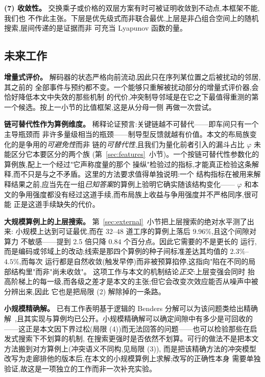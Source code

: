 \documentclass[manuscript,screen,review]{acmart}
\newcommand{\PubGapBig}{9.96\%}           %
\newcommand{\PubBudgetRatio}{2.5}
\newcommand{\PubBudgetGainPP}{0.84}       %
\newcommand{\PubCvBig}{$2.3\%$--$4.5\%$} %
\begin{document}
\textbf{(7) 收敛性。} 交换乘子或价格的双层方案有时可被证明收敛到不动点,本框架不能,我们也
不作此主张。下层是优先级式而非联合最优,上层是非凸组合空间上的随机搜索,层间传递的是证据而非
可充当 Lyapunov 函数的量。

\subsection{未来工作}
\label{sec:future_work}

\textbf{增量式评价。} 解码器的状态严格向前流动,因此只在序列某位置之后被扰动的邻居,其之前的
全部事件与预约都不变。一个能够只重解被扰动部分的增量式评价器,会恰好降低本文中失效的那些机制
的代价,冲突制导邻域是在它之下最值得重测的第一个候选。按上一小节的比值框架,这是从分母一侧
再做一次尝试。

\textbf{链可替代性作为算例维度。} 稀释论证预言:关键链越不可替代——即车间只有一个主导瓶颈而
非许多量级相当的瓶颈——制导型反馈就越有价值。本文的布局族变化的是争用的\emph{可避免性}而非
链的\emph{可替代性},且我们为量化前者引入的漏斗占比 $\varphi$ 未能区分它本要区分的两个族
(第~\ref{sec:features}~小节)。一个按链可替代性参数化的算例族,配上一个经过"它声称度量的那个
操纵"检验过的指标,才能真正检验这条解释,而不只是与之不矛盾。这里的方法要求值得单独说明:一个
结构指标在被用来解释结果之前,应当先在一组\emph{已知答案}的算例上验明它确实随该结构变化——
$\varphi$ 和本文的争用强度都没有经过这道手续,而布局族上收益与争用强度并不严格同序,很可能
正是这道手续缺失的代价。

\textbf{大规模算例上的上层搜索。} 第~\ref{sec:external}~小节把上层搜索的绝对水平测了出来:
小规模上达到可证最优,而在 $32$--$48$ 道工序的算例上落后 \PubGapBig{},且这个间隙对算力
不敏感——提到 \PubBudgetRatio{} 倍只降 $\PubBudgetGainPP$ 个百分点。因此它需要的不是更长的
运行,而是编码或邻域上的改动;线索是那四个算例的种子间标准差达其均值的 \PubCvBig{},而每次
运行都是自然收敛(触发早停)而非被预算掐停,这指向"陷在不同的局部结构里"而非"尚未收敛"。
这项工作与本文的机制结论\emph{正交}:上层变强会同时
抬高阶梯上的每一级,而各级之差才是本文的主张;但它会改变次效应能否从噪声中被分辨出来,因此
它也是把局限 (2) 解除掉的一条路。

\textbf{小规模精确解。} 已有工作表明基于逻辑的 Benders 分解可以为该问题类给出精确
解~\cite{vanos2026exact},且其实现与算例均已公开。小规模精确解可以确定间隙中有多少是可回收的
——这正是本文因下界过松(局限 (4))而无法回答的问题——也可以检验那些在启发式搜索下不划算的机制,
在搜索更强时是否依然不划算。可行的做法不是把本文方法搬到对方算例上(冲突语义不同构,见局限 (3)),
而是把该精确方法的冲突模型改写为走廊排他的版本后,在本文的小规模算例上求解;改写的正确性本身
需要单独验证,故这是一项独立的工作而非一次补充实验。
\end{document}
